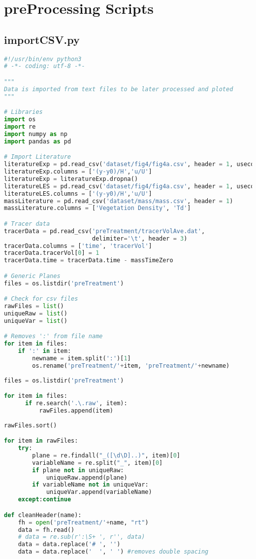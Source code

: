 \section{preProcessing Scripts}
\subsection{importCSV.py}
\begin{lstlisting}[language=python]
#!/usr/bin/env python3
# -*- coding: utf-8 -*-

"""
Data is imported from text files to be later processed and ploted
"""

# Libraries
import os
import re
import numpy as np
import pandas as pd

# Import Literature
literatureExp = pd.read_csv('dataset/fig4/fig4a.csv', header = 1, usecols=(0,1))
literatureExp.columns = ['(y-y0)/H','u/U']
literatureExp = literatureExp.dropna()
literatureLES = pd.read_csv('dataset/fig4/fig4a.csv', header = 1, usecols=(2,3))
literatureLES.columns = ['(y-y0)/H','u/U']
massLiterature = pd.read_csv('dataset/mass/mass.csv', header = 1)
massLiterature.columns = ['Vegetation Density', 'Td']

# Tracer data
tracerData = pd.read_csv('preTreatment/tracerVolAve.dat',
                         delimiter='\t', header = 3)
tracerData.columns = ['time', 'tracerVol']
tracerData.tracerVol[0] = 1
tracerData.time = tracerData.time - massTimeZero

# Generic Planes
files = os.listdir('preTreatment')

# Check for csv files
rawFiles = list()
uniqueRaw = list()
uniqueVar = list()

# Removes ':' from file name
for item in files:
    if ':' in item:    
        newname = item.split(':')[1]
        os.rename('preTreatment/'+item, 'preTreatment/'+newname)
        
files = os.listdir('preTreatment')

for item in files:
      if re.search('.\.raw', item):
          rawFiles.append(item)
          
rawFiles.sort()

for item in rawFiles:
    try:
        plane = re.findall("_([\d\D]..)", item)[0]
        variableName = re.split("_", item)[0]
        if plane not in uniqueRaw:
            uniqueRaw.append(plane)
        if variableName not in uniqueVar:
            uniqueVar.append(variableName)
    except:continue

def cleanHeader(name):
    fh = open('preTreatment/'+name, "rt")
    data = fh.read()
    # data = re.sub(r':\S+ ', r'', data)
    data = data.replace('# ', '')
    data = data.replace('  ', ' ') #removes double spacing
    

\end{lstlisting}
